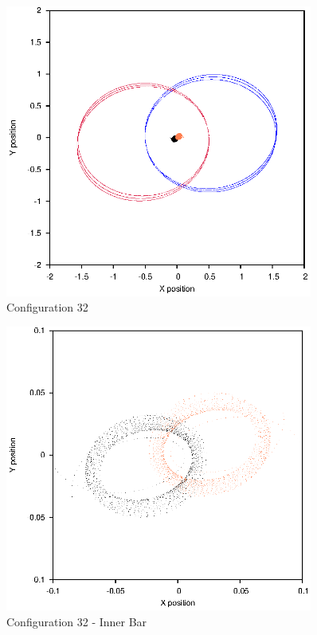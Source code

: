\documentclass[a4paper,12pt]{article}
\begin{document}
\begin{figure}[H]
\centering
\includegraphics[width=0.9\textwidth]{./2017results/1-1-1021-1/Orbit.eps}
\caption{Configuration 32}
\label{fig:config32}
\end{figure}
\begin{figure}[H]
\centering
\includegraphics[width=0.9\textwidth]{./2017results/1-1-1021-1/Inner.eps}
\caption{Configuration 32 - Inner Bar}
\label{fig:config32i}
\end{figure}
\end{document}
